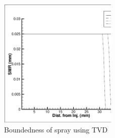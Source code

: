 \documentclass[a4paper,10pt]{article}
\begin{document}
%
\begin{figure}[H]
\centering
\includegraphics[width=0.5\textwidth]{pc_107_cl.eps}
\caption{Boundedness of spray using TVD}
\label{fig:tvd_cl}
\end{figure}
\end{document}

